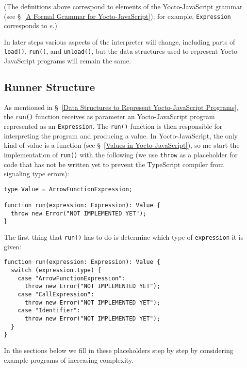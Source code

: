 \documentclass[12pt, oneside]{book}
\begin{document}
(The definitions above correspond to elements of the Yocto-JavaScript grammar (see §~\ref{A Formal Grammar for Yocto-JavaScript}); for example, \texttt{Expression} corresponds to $e$.)

In later steps various aspects of the interpreter will change, including parts of \texttt{load()}, \texttt{run()}, and \texttt{unload()}, but the data structures used to represent Yocto-JavaScript programs will remain the same.

\subsection{Runner Structure}
\label{Runner Structure}

As mentioned in §~\ref{Data Structures to Represent Yocto-JavaScript Programs}, the \texttt{run()} function receives as parameter an Yocto-JavaScript program represented as an \texttt{Expression}. The \texttt{run()} function is then responsible for interpreting the program and producing a value. In Yocto-JavaScript, the only kind of value is a function (see §~\ref{Values in Yocto-JavaScript}), so me start the implementation of \texttt{run()} with the following (we use \texttt{throw} as a placeholder for code that has not be written yet to prevent the TypeScript compiler from signaling type errors):

\begin{verbatim}
type Value = ArrowFunctionExpression;

function run(expression: Expression): Value {
  throw new Error("NOT IMPLEMENTED YET");
}
\end{verbatim}

The first thing that \texttt{run()} has to do is determine which type of \texttt{expression} it is given:

\begin{verbatim}
function run(expression: Expression): Value {
  switch (expression.type) {
    case "ArrowFunctionExpression":
      throw new Error("NOT IMPLEMENTED YET");
    case "CallExpression":
      throw new Error("NOT IMPLEMENTED YET");
    case "Identifier":
      throw new Error("NOT IMPLEMENTED YET");
  }
}
\end{verbatim}

In the sections below we fill in these placeholders step by step by considering example programs of increasing complexity.
\end{document}
